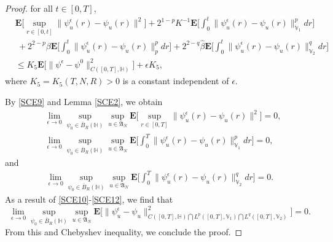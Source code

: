 \documentclass[10pt,a4paper]{amsart}
\renewcommand{\leq}{\leqslant}
\begin{document}
\begin{proof}
for all $t\in [0,T]$,
 \begin{align}\label{SCE9}
&\mathbf{E}\Big[\sup_{r\in[0,t]}
\|\psi^\epsilon_u(r)
-\psi_u(r)
\|^2\Big]+2^{1-p}K^{-1}\mathbf{E}
\bigg[\int_0^{t}
\|\psi^\epsilon_u(r)
-\psi_u(r)\|^p_{\dot{\mathbb{V}}_1}dr\bigg]
\nonumber\\&\ +2^{2-p}\beta\mathbf{E}
\bigg[
\int_0^{t}
\|\psi^\epsilon_u(r)
-\psi_u(r)\|_{p}^{p}dr\bigg]
+2^{2-q}\widehat{\beta}\mathbf{E}
\bigg[
\int_0^{t}\|\psi^\epsilon_u(r)
-\psi_u(r)\|_{\mathbb{V}_2}^{q}dr\bigg]
\nonumber\\&\leq
K_5\mathbf{E}\Big[\|\psi^\epsilon-\psi^0
\|^2_{C([0,T],\mathbb{H} )}\Big]
+\epsilon K_5,
\end{align}
where $K_5=K_5(T,N,R)>0$  is a constant independent of $\epsilon$.

By \eqref{SCE9} and Lemma \ref{SCE2}, we obtain
\begin{align}\label{SCE10}
&\lim_{\epsilon\rightarrow0}\sup_{\psi_{0}\in \overline{B}_{R}(\mathbb{H})}
\sup_{u\in \mathfrak{A}_N}
\mathbf{E}\Big[\sup_{r\in[0,T]}
\|\psi^\epsilon_u(r)
-\psi_u(r)
\|^2\Big]=0,
\\&\label{SCE11}\lim_{\epsilon\rightarrow0}
\sup_{\psi_{0}\in \overline{B}_{R}(\mathbb{H})}
\sup_{u\in \mathfrak{A}_N}\mathbf{E}
\bigg[\int_0^{T}
\|\psi^\epsilon_u(r)
-\psi_u(r)\|^p_{\mathbb{V}_1}dr\bigg]
=0,
\end{align}
and
\begin{align}\label{SCE12}
\lim_{\epsilon\rightarrow0}\sup_{\psi_{0}\in \overline{B}_{R}(\mathbb{H})}
\sup_{u\in \mathfrak{A}_N}\mathbf{E}
\bigg[
\int_0^{T}\|\psi^\epsilon_u(r)
-\psi_u(r)\|_{\mathbb{V}_2}^{q}dr\bigg]=0.
\end{align}
As a result of \eqref{SCE10}-\eqref{SCE12}, we find that
$$\lim_{\epsilon\rightarrow0}\sup_{\psi_{0}\in \overline{B}_{R}(\mathbb{H})}
\sup_{u\in \mathfrak{A}_N}
\mathbf{E}\Big[ \|\psi^\epsilon_u-\psi_u\|^2_{C([0,T],\mathbb{H}) \bigcap L^p([0,T], \mathbb{V}_1)\bigcap L^q([0,T], \mathbb{V}_2)}\Big]=0.$$
From this and Chebyshev inequality, we conclude the proof.
\end{proof}
\end{document}

